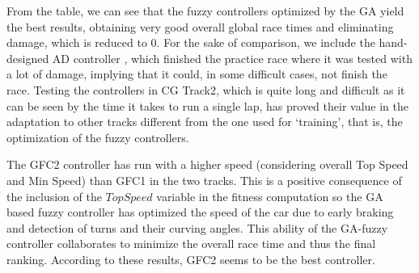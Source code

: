 \documentclass[sigconf]{acmart}
\begin{document}
From the table, we can see that the fuzzy controllers optimized by the
GA yield the best results, obtaining very good overall global race
times and eliminating damage, which is reduced to 0. For the sake of
comparison, we include the hand-designed AD controller \cite{evo17},
which finished the practice race where it was tested with a lot of
damage, implying that it could, in some difficult cases, not finish
the race. 
Testing the controllers in CG Track2, which is quite long and
difficult as it can be seen by the time it takes to run a single lap,
has proved their value in the adaptation to other tracks different
from the one used for `training', that is, the optimization of the
fuzzy controllers. 

The GFC2 controller has run with a higher speed (considering overall Top
Speed and Min Speed) than GFC1 in the two tracks. This is a positive
consequence of the inclusion of the $TopSpeed$ variable in the fitness
computation so the GA based fuzzy controller has optimized the speed
of the car due to early braking and detection of turns and their
curving angles. This ability  of the GA-fuzzy controller collaborates
to minimize the overall race time and thus the final ranking.
According to these results, GFC2 seems to be the best controller.
\end{document}
